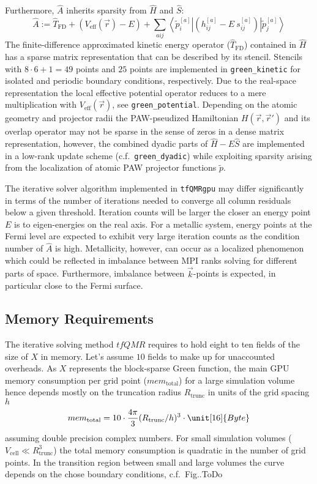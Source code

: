 \documentclass[oribibl]{llncs}
\newcommand{\um}[1]{_{\mathrm{#1}}}
\newcommand{\ttt}[1]{\texttt{#1}}
\newcommand{\braketop}[3]{\left\langle \left. #1 \right| #2 \left| #3 \right. \right\rangle}
\begin{document}
Furthermore, $\hat A$ inherits sparsity from $\hat H$ and $\hat S$:
\begin{equation}
	\hat A := \hat T\um{FD} + \left(V\um{eff}(\vec r) - E\right) + \sum_{aij} \braketop{\tilde p^{[a]}_i}{(h^{[a]}_{ij} - E\ s^{[a]}_{ij})}{\tilde p^{[a]}_j}
\end{equation}
The finite-difference approximated kinetic energy operator ($\hat T\um{FD}$) contained in $\hat H$ has a sparse matrix representation
that can be described by its stencil. Stencils with $8\cdot 6 + 1 = 49$ points and $25$ points are implemented in \ttt{green\_kinetic} for isolated and periodic boundary conditions, respectively.
Due to the real-space representation the local effective potential operator reduces to a mere multiplication with $V\um{eff}(\vec r)$, see \ttt{green\_potential}.
Depending on the atomic geometry and projector radii the \ac{PAW}-pseudized Hamiltonian $H(\vec r,\vec r')$ and its overlap operator may not be sparse in the sense of zeros in a dense matrix representation,
however, the combined dyadic parts of $\hat H - E\hat S$ are implemented in a low-rank update scheme (c.f.~\ttt{green\_dyadic}) while exploiting sparsity arising from the localization of atomic \ac{PAW} projector functions $\tilde p$.

\noindent
The iterative solver algorithm implemented in \ttt{tfQMRgpu} may differ significantly in terms of the number of iterations needed to converge all column residuals below a given threshold. Iteration counts will be larger the closer an energy point $E$ is to eigen-energies on the real axis. For a metallic system, energy points at the Fermi level are expected to exhibit very large iteration counts as the condition number of $\hat A$ is high. Metallicity, however, can occur as a localized phenomenon which could be reflected in imbalance between \ac{MPI} ranks solving for different parts of space.
Furthermore, imbalance between $\vec k$-points is expected, in particular close to the Fermi surface.


\subsection{Memory Requirements}
The iterative solving method $tfQMR$ requires to hold eight to ten fields of the size of $X$ in memory. Let's assume $10$ fields to make up for unaccounted overheads.
As $X$ represents the block-sparse Green function, the main \ac{GPU} memory consumption per grid point ($mem\um{total}$) for a large simulation volume hence depends mostly on the truncation radius $R\um{trunc}$ in units of the grid spacing $h$
\begin{equation} 
	mem\um{total} = 10 \cdot \frac{4\pi}{3}(R\um{trunc}/h)^3 \cdot \unit[16]{Byte}
\end{equation}
assuming double precision complex numbers.
For small simulation volumes ($V\um{cell} \ll R\um{trunc}^3$) the total memory consumption is quadratic in the number of grid points. In the transition region between small and large volumes the curve depends on the chose boundary conditions, c.f.~Fig..ToDo
\end{document}
